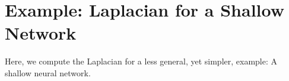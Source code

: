 \section{Example: Laplacian for a Shallow Network}

Here, we compute the Laplacian for a less general, yet simpler, example: A shallow neural network.

\begin{comment}
  For the one-dimensional shallow case we have
  \[ u_\theta(x) = \sum_{i=1}^m a_i\sigma(b_i x + c_i) + d. \]
  Then
  \[ u_\theta'(x) = \sum_{i=1}^m a_ib_i\sigma'(b_i x + c_i) \]
  and
  \[ u_\theta''(x) = \sum_{i=1}^m a_ib_i^2\sigma''(b_i x + c_i). \]
  The parameter derivative of the Laplacian (i.e., second-order derivative)
  \begin{align*}
    \partial_{a_i}u_\theta''(x) & = b_i^2\sigma''(b_i x + c_i) \\
    \partial_{b_i}u_\theta''(x) & = 2a_ib_i\sigma''(b_i x + c_i) + a_i b_i^2x\sigma^{(3)}(b_i x + c_i) \\
    \partial_{c_i}u_\theta''(x) & = a_i b_i^2\sigma^{(3)}(b_i x + c_i) \\
    \partial_{d}u_\theta''(x) & = 0.
  \end{align*}
  The parameter derivative of the Laplacian (i.e., second-order derivative)
  \begin{align*}
    \partial_{a_i}u_\theta''(x) & = b_i^2\sigma''(b_i x + c_i) \\
    \partial_{b_i}u_\theta''(x) & = 2a_ib_i\sigma''(b_i x + c_i) + a_i b_i^2x\sigma^{(3)}(b_i x + c_i) \\
    \partial_{c_i}u_\theta''(x) & = a_i b_i^2\sigma^{(3)}(b_i x + c_i) \\
    \partial_{d}u_\theta''(x) & = 0.
  \end{align*}
\end{comment}

